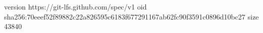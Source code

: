 version https://git-lfs.github.com/spec/v1
oid sha256:70eeef52f89882c22a826595c6183f677291167ab62fc90f3591c0896d10bc27
size 43840

